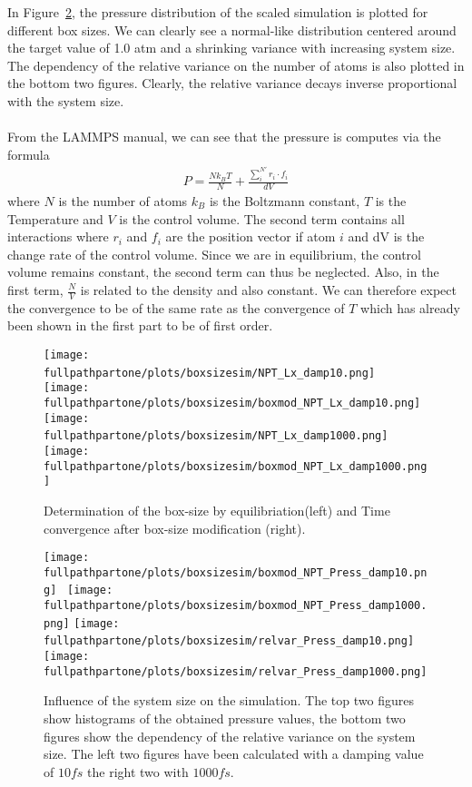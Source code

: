 \documentclass[10pt,a4paper]{report}
\def \fullpathpartone {/home/lukas/Desktop/project/independence/atomistic_modeling/exam/1_three-dimensional_atomic_system}
\begin{document}
In Figure~\ref{fig:pressure_over_boxsize}, the pressure distribution of the scaled simulation is plotted for different box sizes. We can clearly see a normal-like distribution centered around the target value of 1.0 atm and a shrinking variance with increasing system size.\\
The dependency of the relative variance on the number of atoms is also plotted in the bottom two figures. Clearly, the relative variance decays inverse proportional with the system size.\\
 \\
From the LAMMPS manual, we can see that the pressure is computes via the formula
\begin{align}
P=\frac{N k_B T}{N}+\frac{\sum_i^{N'}r_i\cdot f_i}{dV}
\end{align}
where $N$ is the number of atoms $k_B$ is the Boltzmann constant, $T$ is the Temperature and $V$ is the control volume. The second term contains all interactions where $r_i$ and $f_i$ are the position vector if atom $i$ and dV is the change rate of the control volume. Since we are in equilibrium, the control volume remains constant, the second term can thus be neglected. Also, in the first term, $\frac{N}{V}$ is related to the density and also constant. We can therefore expect the convergence to be of the same rate as the convergence of $T$ which has already been shown in the first part to be of first order.


\begin{center}
\begin{figure}[h]
\texttt{[image: \\fullpathpartone/plots/boxsizesim/NPT\_Lx\_damp10.png]}~
\texttt{[image: \\fullpathpartone/plots/boxsizesim/boxmod\_NPT\_Lx\_damp10.png]}
\texttt{[image: \\fullpathpartone/plots/boxsizesim/NPT\_Lx\_damp1000.png]}~
\texttt{[image: \\fullpathpartone/plots/boxsizesim/boxmod\_NPT\_Lx\_damp1000.png]}
\caption[aaa]{Determination of the box-size by equilibriation(left) and Time convergence after box-size modification (right). }
\label{fig:p1_boxsize}
\end{figure}
\end{center}


\begin{center}
\begin{figure}[h]
\texttt{[image: \\fullpathpartone/plots/boxsizesim/boxmod\_NPT\_Press\_damp10.png]}~
\texttt{[image: \\fullpathpartone/plots/boxsizesim/boxmod\_NPT\_Press\_damp1000.png]}
\texttt{[image: \\fullpathpartone/plots/boxsizesim/relvar\_Press\_damp10.png]}~
\texttt{[image: \\fullpathpartone/plots/boxsizesim/relvar\_Press\_damp1000.png]}
\caption[aaa]{Influence of the system size on the simulation. The top two figures show histograms of the obtained pressure values, the bottom two figures show the dependency of the relative variance on the system size. The left two figures have been calculated with a damping value of $10 fs$ the right two with $1000 fs$.}
\label{fig:pressure_over_boxsize}
\end{figure}
\end{center}
\end{document}
